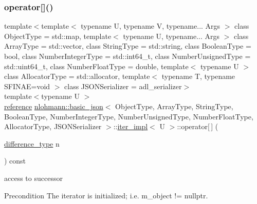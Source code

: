 \subsubsection{\texorpdfstring{operator[]()}{operator[]()}}
{\footnotesize\ttfamily template$<$template$<$ typename U, typename V, typename... Args $>$ class Object\+Type = std\+::map, template$<$ typename U, typename... Args $>$ class Array\+Type = std\+::vector, class String\+Type  = std\+::string, class Boolean\+Type  = bool, class Number\+Integer\+Type  = std\+::int64\+\_\+t, class Number\+Unsigned\+Type  = std\+::uint64\+\_\+t, class Number\+Float\+Type  = double, template$<$ typename U $>$ class Allocator\+Type = std\+::allocator, template$<$ typename T, typename S\+F\+I\+N\+A\+E=void $>$ class J\+S\+O\+N\+Serializer = adl\+\_\+serializer$>$ \\
template$<$typename U $>$ \\
\mbox{\hyperlink{classnlohmann_1_1basic__json_1_1iter__impl_ae09599e9cb4a947020a0265c0c4f3d5e}{reference}} \mbox{\hyperlink{classnlohmann_1_1basic__json}{nlohmann\+::basic\+\_\+json}}$<$ Object\+Type, Array\+Type, String\+Type, Boolean\+Type, Number\+Integer\+Type, Number\+Unsigned\+Type, Number\+Float\+Type, Allocator\+Type, J\+S\+O\+N\+Serializer $>$\+::\mbox{\hyperlink{classnlohmann_1_1basic__json_1_1iter__impl}{iter\+\_\+impl}}$<$ U $>$\+::operator\mbox{[}$\,$\mbox{]} (\begin{DoxyParamCaption}\item[{\mbox{\hyperlink{classnlohmann_1_1basic__json_1_1iter__impl_aa3d908ee643e5938d32e5f6d261d7715}{difference\+\_\+type}}}]{n }\end{DoxyParamCaption}) const\hspace{0.3cm}{\ttfamily [inline]}}



access to successor 

\begin{DoxyPrecond}{Precondition}
The iterator is initialized; i.\+e. {\ttfamily m\+\_\+object != nullptr}. 
\end{DoxyPrecond}
\mbox{\label{classnlohmann_1_1basic__json_1_1iter__impl_a92e849ca687355935c02f492be936b68}} 
